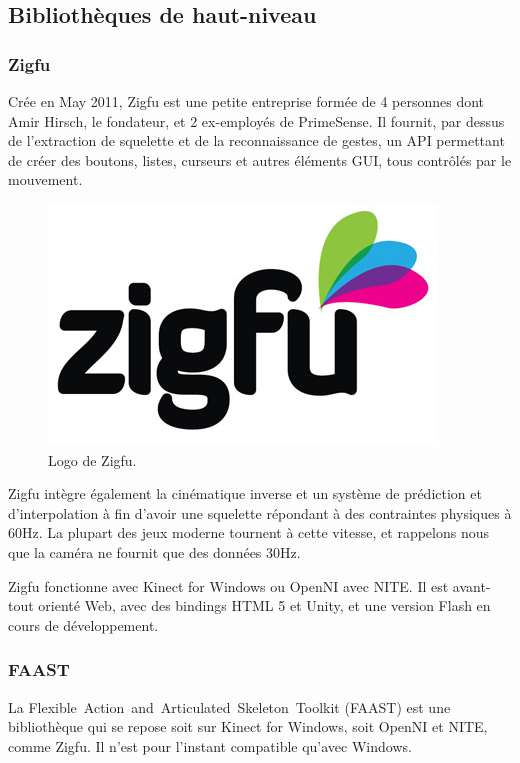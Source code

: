 \documentclass[french,12pt]{report}
\begin{document}
  
  \subsection{Bibliothèques de haut-niveau}
  
  \subsubsection{Zigfu}
  Crée en May 2011, Zigfu est une petite entreprise formée de 4 personnes dont 
  Amir Hirsch, le fondateur, et 2 ex-employés de PrimeSense. Il fournit, 
  par dessus de l'extraction de squelette et de la reconnaissance
  de gestes, un API permettant de créer des boutons, listes, curseurs et autres
  éléments GUI, tous contrôlés par le mouvement.
  \begin{figure}[h!]
  \centering
  \includegraphics[width=0.3\linewidth]{images/zigfu_logo}
  \caption{Logo de Zigfu.}
  \end{figure}
  Zigfu intègre également la cinématique inverse et un système de 
  prédiction et
  d'interpolation à fin d'avoir une squelette répondant à des contraintes 
  physiques à 60Hz. La plupart des jeux moderne tournent à cette vitesse, et 
  rappelons nous que la caméra ne fournit que des données 30Hz.
  
  Zigfu fonctionne avec Kinect for Windows ou OpenNI avec NITE. Il est 
  avant-tout orienté Web, avec des
  bindings HTML 5 et Unity, et une version Flash en cours de développement.
  

  \subsubsection{FAAST}
  La Flexible~Action~and~Articulated~Skeleton~Toolkit (FAAST) est une 
  bibliothèque qui se repose soit sur Kinect for Windows, soit OpenNI et NITE, 
  comme Zigfu. Il n'est pour l'instant compatible qu'avec Windows.
  
\end{document}
